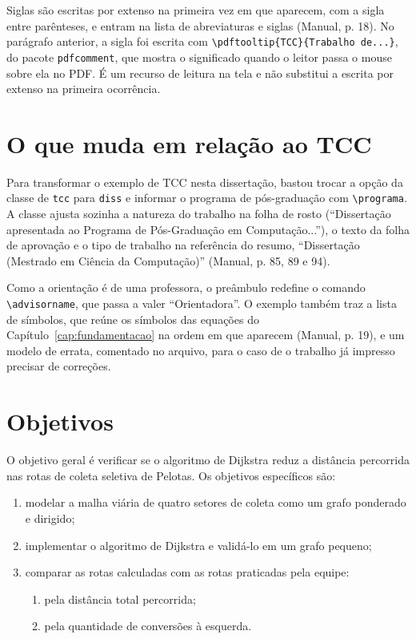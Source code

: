\documentclass[diss,capa]{texufpel}
\begin{document}
Siglas são escritas por extenso na primeira vez em que aparecem, com a sigla
entre parênteses, e entram na lista de abreviaturas e siglas (Manual, p. 18).
No parágrafo anterior, a sigla foi escrita com
\verb|\pdftooltip{TCC}{Trabalho de...}|, do pacote \texttt{pdfcomment}, que
mostra o significado quando o leitor passa o mouse sobre ela no PDF. É um recurso de leitura na tela e não substitui a escrita por extenso
na primeira ocorrência.

\section{O que muda em relação ao TCC}

Para transformar o exemplo de TCC nesta dissertação, bastou trocar a opção
da classe de \texttt{tcc} para \texttt{diss} e informar o programa de
pós-graduação com \verb|\programa|. A classe ajusta sozinha a natureza do
trabalho na folha de rosto (``Dissertação apresentada ao Programa de
Pós-Graduação em Computação...''), o texto da folha de aprovação e o tipo de
trabalho na referência do resumo, ``Dissertação (Mestrado em Ciência da
Computação)'' (Manual, p. 85, 89 e 94).

Como a orientação é de uma professora, o preâmbulo redefine o comando
\verb|\advisorname|, que passa a valer ``Orientadora''. O exemplo também traz a
lista de símbolos, que reúne os símbolos das equações do
Capítulo~\ref{cap:fundamentacao} na ordem em que aparecem (Manual, p. 19), e
um modelo de errata, comentado no arquivo, para o caso de o trabalho já
impresso precisar de correções.

\section{Objetivos}
\label{sec:objetivos}

O objetivo geral é verificar se o algoritmo de Dijkstra reduz a distância
percorrida nas rotas de coleta seletiva de Pelotas. Os objetivos específicos
são:

\begin{enumerate}
  \item modelar a malha viária de quatro setores de coleta como um grafo
        ponderado e dirigido;
  \item implementar o algoritmo de Dijkstra e validá-lo em um grafo pequeno;
  \item comparar as rotas calculadas com as rotas praticadas pela equipe:
  \begin{enumerate}
    \item pela distância total percorrida;
    \item pela quantidade de conversões à esquerda.
  \end{enumerate}
\end{enumerate}
\end{document}
